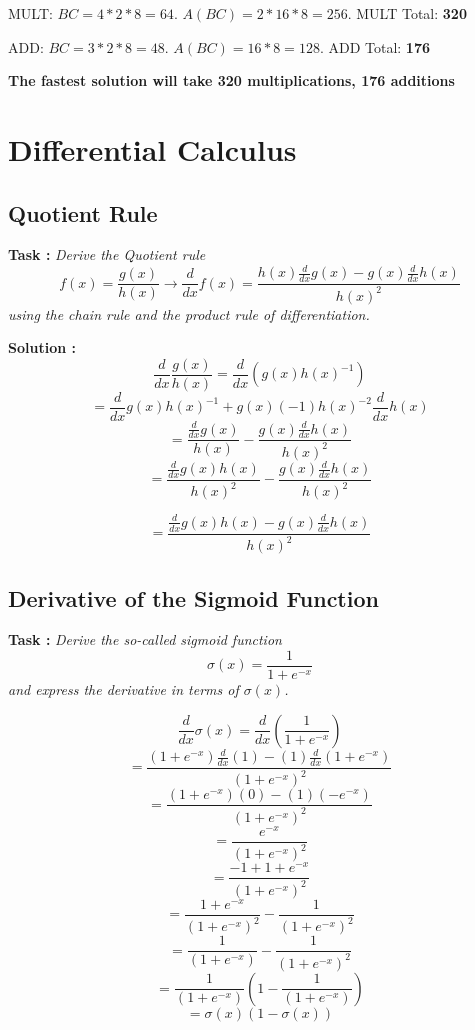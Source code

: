 \documentclass{scrartcl}
\begin{document}
MULT: $BC = 4 * 2 * 8 = 64$. $A(BC) = 2 * 16 * 8 = 256$. MULT Total: \textbf{320}

ADD: $BC = 3 * 2 * 8 = 48$. $A(BC) = 16 * 8 = 128$. ADD Total: \textbf{176}

\textbf{The fastest solution will take 320 multiplications, 176 additions}

\section{Differential Calculus}
\subsection{Quotient Rule}
\textbf{Task :} \textit{Derive the Quotient rule \[f(x) = \frac{g(x)}{h(x)} \rightarrow \frac{d}{dx}f(x) = \frac{h(x)\frac{d}{dx}g(x) - g(x)\frac{d}{dx}h(x)}{h(x)^2}\] 
using the chain rule and the product rule of differentiation.}

\textbf{Solution :}
\[\frac{d}{dx}\frac{g(x)}{h(x)} = \frac{d}{dx}(g(x) h(x)^{-1}) \]
\[ = \frac{d}{dx}g(x) h(x)^{-1} + g(x) (-1) h(x)^{-2} \frac{d}{dx}h(x)\]
\[= \frac{\frac{d}{dx}g(x)}{h(x)} - \frac{g(x)\frac{d}{dx}h(x)}{h(x)^{2}}\]
\[ =  \frac{\frac{d}{dx}g(x)h(x)}{h(x)^{2}} - \frac{g(x)\frac{d}{dx}h(x)}{h(x)^{2}}\]

\[= \frac{\frac{d}{dx}g(x)h(x) - g(x)\frac{d}{dx}h(x)}{h(x)^2}\]

\subsection{Derivative of the Sigmoid Function}
\textbf{Task :} \textit{Derive the so-called sigmoid function
\[\sigma(x) = \frac{1}{1+e^{-x}} \]
and express the derivative in terms of \( \sigma(x) \).}

\[\frac{d}{dx}\sigma(x) = \frac{d}{dx}(\frac{1}{1+e^{-x}})\]
\[= \frac{(1+e^{-x})\frac{d}{dx}(1) - (1)\frac{d}{dx}(1+e^{-x})}{(1+e^{-x})^2}\]
\[= \frac{(1+e^{-x})(0) - (1)(-e^{-x})}{(1+e^{-x})^2}\]
\[= \frac{e^{-x}}{(1+e^{-x})^2}\]
\[= \frac{-1+1+e^{-x}}{(1+e^{-x})^2}\]
\[= \frac{1+e^{-x}}{(1+e^{-x})^2} - \frac{1}{(1+e^{-x})^2}\]
\[= \frac{1}{(1+e^{-x})} - \frac{1}{(1+e^{-x})^2}\]
\[= \frac{1}{(1+e^{-x})}(1 - \frac{1}{(1+e^{-x})}) \]
\[= \sigma(x)(1 - \sigma(x))\]
\end{document}
